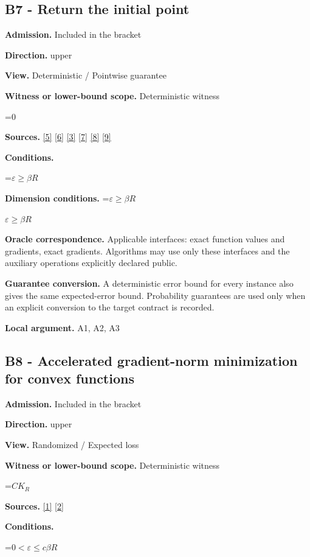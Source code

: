 \documentclass[10pt,a4paper]{article}
\newcommand{\AtlasMath}[1]{\par\begingroup\centering\setbox0=\hbox{$\displaystyle #1$}\ifdim\wd0>1.4\linewidth\typeout{ATLAS WIDE FORMULA: \the\wd0}\fi\ifdim\wd0>\linewidth\resizebox{\linewidth}{!}{\box0}\else\box0\fi\par\endgroup}
\newcommand{\AtlasInlineMath}[1]{\begingroup\setbox0=\hbox{$#1$}\ifdim\wd0>.4\linewidth\endgroup\AtlasMath{#1}\else\endgroup$#1$\fi}
\begin{document}
\subsection{B7 - Return the initial point}
\textbf{Admission.} Included in the bracket

\textbf{Direction.} upper

\textbf{View.} Deterministic / Pointwise guarantee

\textbf{Witness or lower-bound scope.} Deterministic witness

\AtlasMath{0}
\textbf{Sources.} \href{https://arxiv.org/pdf/2101.09740v2}{[5]} \href{https://arxiv.org/pdf/2609.33360v2}{[6]} \href{https://arxiv.org/pdf/2609.10874}{[3]} \href{https://arxiv.org/pdf/1405.4980}{[7]} \href{https://www2.isye.gatech.edu/~nemirovs/MOR_AccuracyCertificates.pdf}{[8]} \href{https://arxiv.org/pdf/2609.20701}{[9]}

\textbf{Conditions.} 
\AtlasMath{\varepsilon\ge\beta R}


\textbf{Dimension conditions.} \AtlasInlineMath{\varepsilon\ge\beta R}

\textbf{Oracle correspondence.} Applicable interfaces: exact function values and gradients, exact gradients. Algorithms may use only these interfaces and the auxiliary operations explicitly declared public.

\textbf{Guarantee conversion.} A deterministic error bound for every instance also gives the same expected-error bound. Probability guarantees are used only when an explicit conversion to the target contract is recorded.

\textbf{Local argument.} A1, A2, A3

\subsection{B8 - Accelerated gradient-norm minimization for convex functions}
\textbf{Admission.} Included in the bracket

\textbf{Direction.} upper

\textbf{View.} Randomized / Expected loss

\textbf{Witness or lower-bound scope.} Deterministic witness

\AtlasMath{CK_R}
\textbf{Sources.} \href{https://arxiv.org/pdf/1803.06600v4}{[1]} \href{https://doi.org/10.1007/s10107-026-02352-2}{[2]}

\textbf{Conditions.} 
\AtlasMath{0<\varepsilon\le c\beta R}
\end{document}
